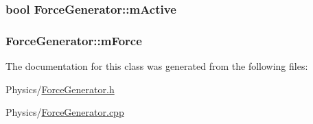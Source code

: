 \subsubsection[{\texorpdfstring{m\+Active}{mActive}}]{\setlength{\rightskip}{0pt plus 5cm}bool Force\+Generator\+::m\+Active\hspace{0.3cm}{\ttfamily [private]}}\hypertarget{classForceGenerator_ac4f487f43bf862af793ebda2477fe85f}{}\label{classForceGenerator_ac4f487f43bf862af793ebda2477fe85f}
\subsubsection[{\texorpdfstring{m\+Force}{mForce}}]{ Force\+Generator\+::m\+Force\hspace{0.3cm}{\ttfamily [private]}}\hypertarget{classForceGenerator_ad9aa4f065b885c07b4e3fc3ee4a5b5a3}{}\label{classForceGenerator_ad9aa4f065b885c07b4e3fc3ee4a5b5a3}


The documentation for this class was generated from the following files\+:\begin{DoxyCompactItemize}
\item 
Physics/\hyperlink{ForceGenerator_8h}{Force\+Generator.\+h}\item 
Physics/\hyperlink{ForceGenerator_8cpp}{Force\+Generator.\+cpp}\end{DoxyCompactItemize}
